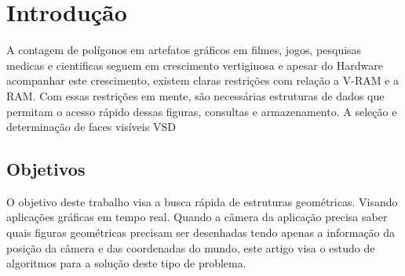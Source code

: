 \chapter{Introdução}

A contagem de polígonos em artefatos gráficos em filmes, jogos, pesquisas medicas e cientificas seguem em crescimento
vertiginosa e apesar do Hardware acompanhar este crescimento, existem claras restrições com relação a \gls{V-RAM} e a
\gls{RAM}. Com essas restrições em mente, são necessárias estruturas de dados que permitam o acesso rápido dessas
figuras, consultas e armazenamento.
A seleção e determinação de faces visíveis \gls{VSD}




\section{Objetivos}

O objetivo deste trabalho visa a busca rápida de estruturas geométricas.
Visando aplicações gráficas em tempo real.
Quando a câmera da aplicação precisa saber quais figuras geométricas precisam ser desenhadas
tendo apenas a informação da posição da câmera e das coordenadas do mundo, este artigo visa
o estudo de algoritmos para a solução deste tipo de problema.




